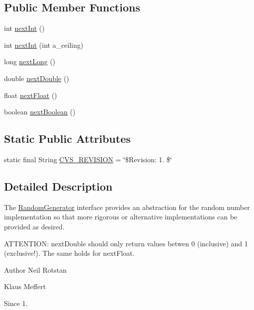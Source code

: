 \subsection*{Public Member Functions}
\begin{DoxyCompactItemize}
\item 
int \hyperlink{interfaceorg_1_1jgap_1_1_random_generator_a993f3b23cfbc3f8001405544580eda2e}{next\-Int} ()
\item 
int \hyperlink{interfaceorg_1_1jgap_1_1_random_generator_a29411be7a476ab217372b7f046536be6}{next\-Int} (int a\-\_\-ceiling)
\item 
long \hyperlink{interfaceorg_1_1jgap_1_1_random_generator_a09b1ace0d1020d186b726bb725557ad2}{next\-Long} ()
\item 
double \hyperlink{interfaceorg_1_1jgap_1_1_random_generator_a708f273cc71846c2ae973172f20f2c01}{next\-Double} ()
\item 
float \hyperlink{interfaceorg_1_1jgap_1_1_random_generator_a0c5ff6cb7faf2d5385405f56f463a070}{next\-Float} ()
\item 
boolean \hyperlink{interfaceorg_1_1jgap_1_1_random_generator_ae1e8373d795fa8269c2f51f2e5525150}{next\-Boolean} ()
\end{DoxyCompactItemize}
\subsection*{Static Public Attributes}
\begin{DoxyCompactItemize}
\item 
static final String \hyperlink{interfaceorg_1_1jgap_1_1_random_generator_a160f82fe77aae0cfc802a2db56b4ee44}{C\-V\-S\-\_\-\-R\-E\-V\-I\-S\-I\-O\-N} = \char`\"{}\$Revision\-: 1. \$\char`\"{}
\end{DoxyCompactItemize}


\subsection{Detailed Description}
The \hyperlink{interfaceorg_1_1jgap_1_1_random_generator}{Random\-Generator} interface provides an abstraction for the random number implementation so that more rigorous or alternative implementations can be provided as desired. 

A\-T\-T\-E\-N\-T\-I\-O\-N\-: next\-Double should only return values betwen 0 (inclusive) and 1 (exclusive!). The same holds for next\-Float.

\begin{DoxyAuthor}{Author}
Neil Rotstan 

Klaus Meffert 
\end{DoxyAuthor}
\begin{DoxySince}{Since}
1. 
\end{DoxySince}


